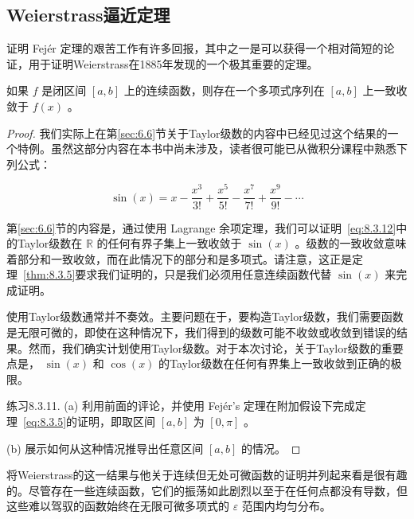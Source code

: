 \subsection{Weierstrass逼近定理}

证明 Fej\'er 定理的艰苦工作有许多回报，其中之一是可以获得一个相对简短的论证，用于证明Weierstrass在1885年发现的一个极其重要的定理。

\begin{Thm}
  \label{thm:8.3.5}
  如果 \(f\) 是闭区间 \(\left\lbrack  {a,b}\right\rbrack\) 上的连续函数，则存在一个多项式序列在 \(\left\lbrack  {a,b}\right\rbrack\) 上一致收敛于 \(f\left( x\right)\) 。
\end{Thm}

\begin{proof}
我们实际上在第\ref{sec:6.6}节关于Taylor级数的内容中已经见过这个结果的一个特例。虽然这部分内容在本书中尚未涉及，读者很可能已从微积分课程中熟悉下列公式：

\begin{equation}
\label{eq:8.3.12}
\sin \left( x\right)  = x - \frac{{x}^{3}}{3!} + \frac{{x}^{5}}{5!} - \frac{{x}^{7}}{7!} + \frac{{x}^{9}}{9!} - \cdots
\end{equation}

第\ref{sec:6.6}节的内容是，通过使用 Lagrange 余项定理，我们可以证明~\eqref{eq:8.3.12}中的Taylor级数在 \(\mathbb{R}\) 的任何有界子集上一致收敛于 \(\sin \left( x\right)\) 。级数的一致收敛意味着部分和一致收敛，而在此情况下的部分和是多项式。请注意，这正是定理~\ref{thm:8.3.5}要求我们证明的，只是我们必须用任意连续函数代替 \(\sin \left( x\right)\) 来完成证明。

使用Taylor级数通常并不奏效。主要问题在于，要构造Taylor级数，我们需要函数是无限可微的，即使在这种情况下，我们得到的级数可能不收敛或收敛到错误的结果。然而，我们确实计划使用Taylor级数。对于本次讨论，关于Taylor级数的重要点是， \(\sin \left( x\right)\) 和 \(\cos \left( x\right)\) 的Taylor级数在任何有界集上一致收敛到正确的极限。

练习8.3.11. (a) 利用前面的评论，并使用 Fej\'er's 定理在附加假设下完成定理~\eqref{eq:8.3.5}的证明，即取区间 \(\left\lbrack  {a,b}\right\rbrack\) 为 \(\left\lbrack  {0,\pi }\right\rbrack\) 。

(b) 展示如何从这种情况推导出任意区间 \(\left\lbrack  {a,b}\right\rbrack\) 的情况。  
\end{proof}


将Weierstrass的这一结果与他关于连续但无处可微函数的证明并列起来看是很有趣的。尽管存在一些连续函数，它们的振荡如此剧烈以至于在任何点都没有导数，但这些难以驾驭的函数始终在无限可微多项式的 \(\varepsilon\) 范围内均匀分布。

